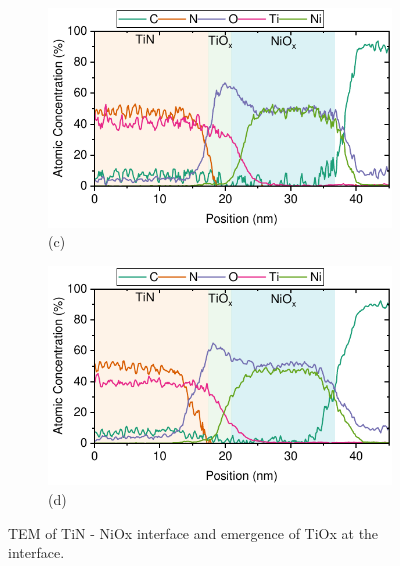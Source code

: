 \begin{figure}[htbp]
    \begin{subfigure}[t]{0.49\textwidth}
        \centering
        \includegraphics[width=\textwidth]{chapters/material_properties/images/TEM_30_min.pdf} %
        \caption*{(c)}
    \end{subfigure}
    \hfill
    \begin{subfigure}[t]{0.49\textwidth}
        \centering
        \includegraphics[width=\textwidth]{chapters/material_properties/images/TEM_60_min.pdf} %
        \caption*{(d)}
    \end{subfigure}
    \caption{TEM of TiN - NiOx interface and emergence of TiOx at the interface.}
\end{figure}




\cleardoublepage

